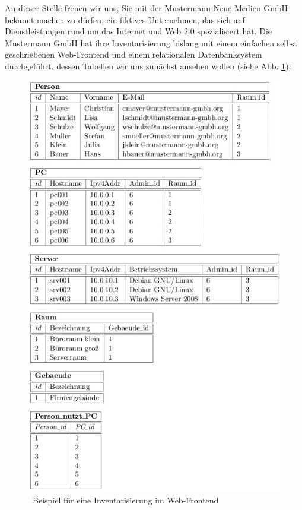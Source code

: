 \documentclass[a4paper,10pt]{book}
\begin{document}
An dieser Stelle freuen wir uns, Sie mit der Mustermann Neue Medien GmbH bekannt machen zu dürfen, ein fiktives Unternehmen, das sich auf Dienstleistungen rund um das Internet und Web 2.0 spezialisiert hat. Die Mustermann GmbH hat ihre Inventarisierung bislang mit einem einfachen selbst geschriebenen Web-Frontend und einem
relationalen Datenbanksystem durchgeführt, dessen Tabellen wir uns zunächst ansehen wollen (siehe Abb. \ref{Beispiel fuer eine Inventarisierung im Web-Frontend}):
\newline
\begin{figure}[htb!]
  \centering
  \includegraphics[scale=.6]{Screenshot/SyncAPI_Fallstudie_01.jpg}
  \caption{\label{Beispiel fuer eine Inventarisierung im Web-Frontend} \ Beispiel für eine Inventarisierung im Web-Frontend}
\end{figure}
\end{document}
